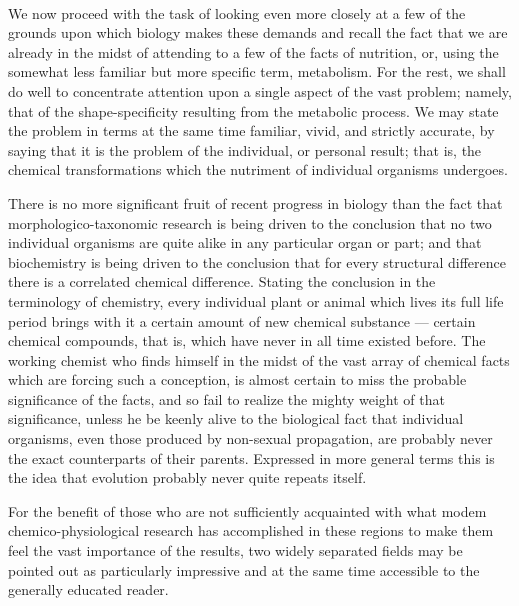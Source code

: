 \documentclass[a4paper, 11pt, oneside, polutonikogreek, english]{article}
\begin{document}
\paragraph{}
We now proceed with the task of looking even more closely at a few of the grounds upon which biology makes these demands and recall the fact that we are already in the midst of attending to a few of the facts of nutrition, or, using the somewhat less familiar but more specific term, metabolism. For the rest, we shall do well to concentrate attention upon a single aspect of the vast problem; namely, that of the shape-specificity resulting from the metabolic process. We may state the problem in terms at the same time familiar, vivid, and strictly accurate, by saying that it is the problem of the individual, or personal result; that is, the chemical transformations which the nutriment of individual organisms undergoes.

There is no more significant fruit of recent progress in biology than the fact that morphologico-taxonomic research is being driven to the conclusion that no two individual organisms are quite alike in any particular organ or part; and that biochemistry is being driven to the conclusion that for every structural difference there is a correlated chemical difference. Stating the conclusion in the terminology of chemistry, every individual plant or animal which lives its full life period brings with it a certain amount of new chemical substance --- certain chemical compounds, that is, which have never in all time existed before. The working chemist who finds himself in the midst of the vast array of chemical facts which are forcing such a conception, is almost certain to miss the probable significance of the facts, and so fail to realize the mighty weight of that significance, unless he be keenly alive to the biological fact that individual organisms, even those produced by non-sexual propagation, are probably never the exact counterparts of their parents. Expressed in more general terms this is the idea that evolution probably never quite repeats itself.

For the benefit of those who are not sufficiently acquainted with what modem chemico-physiological research has accomplished in these regions to make them feel the vast importance of the results, two widely separated fields may be pointed out as particularly impressive and at the same time accessible to the generally educated reader.
\end{document}
